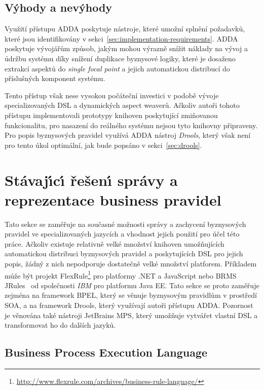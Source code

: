 \subsection{Výhody a nevýhody}

Využití přístupu \gls{ADDA} poskytuje nástroje, které umožní splnění požadavků,
které jsou identifikovány v sekci~\ref{sec:implementation-requirements}.
\gls{ADDA} poskytuje vývojářům způsob, jakým mohou výrazně snížit náklady na vývoj a údržbu
systému díky snížení duplikace byznysové logiky, které je dosaženo extrakcí aspektů
do \textit{single focal point} a jejich automatickou distribucí do příslušných komponent
systému.

Tento přístup však nese vysokou počáteční investici v podobě vývoje specializovaných
\gls{DSL} a dynamických aspect weaverů. Ačkoliv autoři tohoto přístupu implementovali prototypy
knihoven poskytující zmiňovanou funkcionalitu, pro nasazení do reálného systému nejsou tyto
knihovny připraveny. Pro popis byznysových pravidel využívá \gls{ADDA} nástroj \textit{Drools},
který však není pro tento úkol optimální, jak bude popsáno v sekci~\ref{sec:drools}.

\section{Stávaj\'{\i}c\'{\i} řešen\'{\i} správy a reprezentace business pravidel}\label{sec:business-rule-dsl}

Tato sekce se zaměřuje na současné možnosti správy a zachycení byznysových pravidel
ve specializovaných jazycích a vhodnost jejich použití pro účel této práce.
Ačkoliv existuje relativně velké množství knihoven umožňujících automatickou distribuci
byznysových pravidel a poskytujících \gls{DSL} pro jejich popis, žádný z nich nepodporuje dostatečně velké množství platforem.
Příkladem může být projekt FlexRule\footnote{\url{http://www.flexrule.com/archives/business-rule-language/}} pro platformy .NET a
JavaScript nebo \gls{BRMS} JRules~\cite{boyer2011ibm} od společnosti \textit{IBM} pro platformu \gls{Java EE}.
Tato sekce se proto zaměřuje zejména na framework \gls{BPEL}, který se věnuje byznysovým pravidlům v prostředí \gls{SOA}, a na
framework Drools, který využívají autoři přístupu \gls{ADDA}. Pozornost je věnována také nástroji JetBrains MPS,
který umožňuje vytvářet vlastní \gls{DSL} a transformovat ho do dalších jazyků.

\subsection{Business Process Execution Language}

